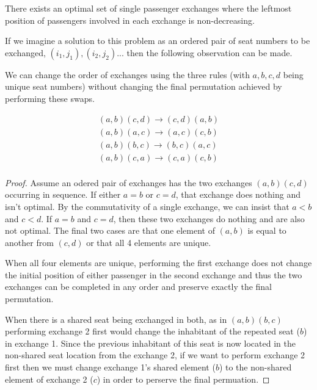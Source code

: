 \begin{thm} \label{thm:sweepCorrectness}
There exists an optimal set of single passenger exchanges where the leftmost position of passengers involved in each exchange is non-decreasing.
\end{thm}


If we imagine a solution to this problem as an ordered pair of seat numbers to be exchanged, $(i_1,j_1), (i_2,j_2)...$ then the following observation can be made. 

\begin{lem} \label{lem:swapRules} 
We can change the order of exchanges using the three rules (with $a,b,c,d$ being unique seat numbers) without changing the final permutation achieved by performing these swaps.

\begin{eqnarray*}
(a,b) (c,d) \rightarrow (c,d) (a,b) \\
(a,b) (a,c) \rightarrow (a,c) (c,b) \\
(a,b) (b,c) \rightarrow (b,c) (a,c) \\
(a,b) (c,a) \rightarrow (c,a) (c,b) \\
\end{eqnarray*}
\end{lem}

\begin{proof}
Assume an odered pair of exchanges has the two exchanges $(a,b) (c,d)$ occurring in sequence. If either $a=b$ or $c=d$, that exchange does nothing and isn't optimal.  By the commutativity of a single exchange, we can insist that $a<b$ and $c<d$.  If $a=b$ and $c=d$, then these two exchanges do nothing and are also not optimal.  The final two cases are that one element of $(a,b)$ is equal to another from $(c,d)$ or that all 4 elements are unique.

When all four elements are unique, performing the first exchange does not change the initial position of either passenger in the second exchange and thus the two exchanges can be completed in any order and preserve exactly the final permutation.

When there is a shared seat being exchanged in both, as in $(a,b) (b,c)$ performing exchange 2 first would change the inhabitant of the repeated seat ($b$) in exchange 1.  Since the previous inhabitant of this seat is now located in the non-shared seat location from the exchange 2, if we want to perform exchange 2 first then we must change exchange 1's shared element ($b$) to the non-shared element of exchange 2 ($c$) in order to perserve the final permuation.
\end{proof}

